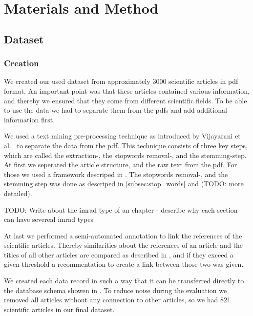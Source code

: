 \chapter{Materials and Method}
\label{cha:materials_and_method}

\section{Dataset}
\label{sec:dataset}

\subsection{Creation}
\label{subsec:creation}

We created our used dataset from approximately 3000 scientific articles in pdf format. An important point was that these articles contained various information, and thereby we ensured that they come from different scientific fields. To be able to use the data we had to separate them from the pdfs and add additional information first.

We used a text mining pre-processing technique as introduced by Vijayarani et al.~\cite{Vijayarani2015} to separate the data from the pdf. This technique consists of three key steps, which are called the extraction-, the stopwords removal-, and the stemming-step. At first we seperated the article structure, and the raw text from the pdf. For those we used a framework descriped in . The stopwords removal-, and the stemming step was done as descriped in \cref{subsec:stop_words} and  (TODO: more detailed).

TODO: Write about the imrad type of an chapter - describe why each section can have severeal imrad types

At last we performed a semi-automated annotation to link the references of the scientific articles. Thereby similarities about the references of an article and the titles of all other articles are compared as described in , and if they exceed a given threshold a recommentation to create a link between those two was given.

We created each data record in such a way that it can be transferred directly to the database schema showen in . To reduce noise during the evaluation we removed all articles without any connection to other articles, so we had 821 scientific articles in our final dataset.

